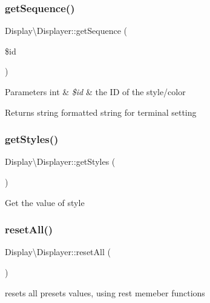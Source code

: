 \subsubsection{\texorpdfstring{get\+Sequence()}{getSequence()}}
{\footnotesize\ttfamily Display\textbackslash{}\+Displayer\+::get\+Sequence (\begin{DoxyParamCaption}\item[{}]{\$id }\end{DoxyParamCaption})\hspace{0.3cm}{\ttfamily [protected]}}


\begin{DoxyParams}[1]{Parameters}
int & {\em \$id} & the ID of the style/color \\
\hline
\end{DoxyParams}
\begin{DoxyReturn}{Returns}
string formatted string for terminal setting 
\end{DoxyReturn}
\mbox{\label{classDisplay_1_1Displayer_af1a84beba7ba2afd60dbe13814db5f42}} 
\subsubsection{\texorpdfstring{get\+Styles()}{getStyles()}}
{\footnotesize\ttfamily Display\textbackslash{}\+Displayer\+::get\+Styles (\begin{DoxyParamCaption}{ }\end{DoxyParamCaption})}

Get the value of style \mbox{\label{classDisplay_1_1Displayer_a42bb7920ed6bc44c6e08747b87b1de63}} 
\subsubsection{\texorpdfstring{reset\+All()}{resetAll()}}
{\footnotesize\ttfamily Display\textbackslash{}\+Displayer\+::reset\+All (\begin{DoxyParamCaption}{ }\end{DoxyParamCaption})}

resets all presets values, using rest memeber functions \mbox{\label{classDisplay_1_1Displayer_afd285ad90f1eb4341a370f17ff7ab725}} 
